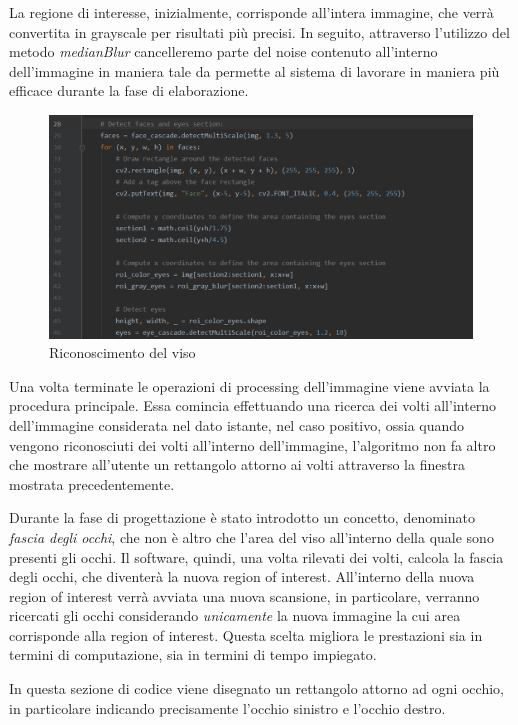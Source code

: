 La regione di interesse, inizialmente, corrisponde all'intera immagine, che verrà convertita in grayscale per risultati più precisi. In seguito, attraverso l'utilizzo del metodo \emph{medianBlur} cancelleremo parte del noise contenuto all'interno dell'immagine in maniera tale da permette al sistema di lavorare in maniera più efficace durante la fase di elaborazione.
\begin{figure}[h!]
	\centering
	\includegraphics[width=120mm]{img/5/codice_1_3}
	\caption{\fontsize{10px}{0mm}\selectfont Riconoscimento del viso \label{fig:codice_1_3}}
\end{figure}\newline

Una volta terminate le operazioni di processing dell'immagine viene avviata la procedura principale. Essa comincia effettuando una ricerca dei volti all'interno dell'immagine considerata nel dato istante, nel caso positivo, ossia quando vengono riconosciuti dei volti all'interno dell'immagine, l'algoritmo non fa altro che mostrare all'utente un rettangolo attorno ai volti attraverso la finestra mostrata precedentemente.

Durante la fase di progettazione è stato introdotto un concetto, denominato \emph{fascia degli occhi}, che non è altro che l'area del viso all'interno della quale sono presenti gli occhi. Il software, quindi, una volta rilevati dei volti, calcola la fascia degli occhi, che diventerà la nuova region of interest.
All'interno della nuova region of interest verrà avviata una nuova scansione, in particolare, verranno ricercati gli occhi considerando \textit{unicamente} la nuova immagine la cui area corrisponde alla region of interest. Questa scelta migliora le prestazioni sia in termini di computazione, sia in termini di tempo impiegato.\newpage

In questa sezione di codice viene disegnato un rettangolo attorno ad ogni occhio, in particolare indicando precisamente l'occhio sinistro e l'occhio destro.

